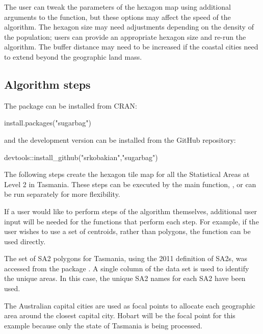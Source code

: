 The user can tweak the parameters of the hexagon map using additional
arguments to the  function, but these options may
affect the speed of the algorithm. The hexagon size may need adjustments
depending on the density of the population; users can provide an
appropriate hexagon size and re-run the algorithm. The buffer distance
may need to be increased if the coastal cities need to extend beyond the
geographic land mass.

\hypertarget{algorithm-steps}{%
\subsection{Algorithm steps}\label{algorithm-steps}}

The package can be installed from CRAN:

\begin{Schunk}
\begin{Sinput}
install.packages("sugarbag")
\end{Sinput}
\end{Schunk}

\noindent and the development version can be installed from the GitHub
repository:

\begin{Schunk}
\begin{Sinput}
devtools::install_github("srkobakian","sugarbag")
\end{Sinput}
\end{Schunk}

The following steps create the hexagon tile map for all the Statistical
Areas at Level 2 in Tasmania. These steps can be executed by the main
function, , or can be run separately for more
flexibility.

If a user would like to perform steps of the algorithm themselves,
additional user input will be needed for the functions that perform each
step. For example, if the user wishes to use a set of centroids, rather
than polygons, the  function can be used directly.

The set of SA2 polygons for Tasmania, using the 2011 definition of SA2s,
was accessed from the  package \citep{absmapsdata}. A
single column of the data set is used to identify the unique areas. In
this case, the unique SA2 names for each SA2 have been used.

The Australian capital cities are used as focal points to allocate each
geographic area around the closest capital city. Hobart will be the
focal point for this example because only the state of Tasmania is being
processed.

